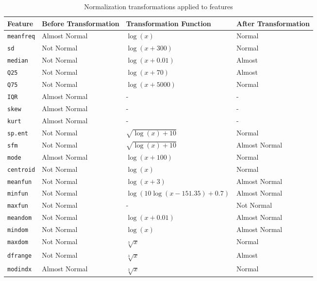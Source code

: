 \documentclass{article}
\begin{document}
	{
		\renewcommand{\arraystretch}{1.5}
		\begin{table}
			\centering
			\begin{tabularx}{\textwidth}{@{}lXlX@{}}
				\toprule
				\textbf{Feature} & \textbf{Before Transformation} & \textbf{Transformation Function} & \textbf{After Transformation} \\
				\midrule
				\texttt{meanfreq} & Almost Normal & $\log(x)$ & Normal \\
				\texttt{sd} & Not Normal & $\log(x + 300)$ & Normal \\
				\texttt{median} & Not Normal & $\log(x + 0.01)$ & Almost \\
				\texttt{Q25} & Not Normal & $\log(x  + 70)$ & Almost \\
				\texttt{Q75} & Not Normal & $\log(x + 5000)$ & Normal \\
				\texttt{IQR} & Almost Normal & - & - \\
				\texttt{skew} & Almost Normal & - & - \\
				\texttt{kurt} & Almost Normal & - & - \\
				\texttt{sp.ent} & Not Normal & $\sqrt{\log(x) + 10}$ & Normal \\
				\texttt{sfm} & Not Normal & $\sqrt{\log(x) + 10}$ & Almost Normal \\
				\texttt{mode} & Almost Normal & $\log(x + 100)$ & Normal \\
				\texttt{centroid} & Not Normal & $\log(x)$ & Normal \\
				\texttt{meanfun} & Not Normal & $\log(x + 3)$ & Almost Normal \\
				\texttt{minfun} & Not Normal & $\log(10 \log(x - 151.35) + 0.7)$ & Almost Normal \\
				\texttt{maxfun} & Not Normal & - & Not Normal \\
				\texttt{meandom} & Not Normal & $\log(x+ 0.01)$ & Almost Normal \\
				\texttt{mindom} & Not Normal & $\log(x)$ & Almost Normal \\
				\texttt{maxdom} & Not Normal & $\sqrt[3]{x}$ & Normal \\
				\texttt{dfrange} & Not Normal & $\sqrt[3]{x}$ & Almost \\
				\texttt{modindx} & Almost Normal & $\sqrt[3]{x}$ & Normal \\
				\bottomrule
			\end{tabularx}
			\caption{Normalization transformations applied to features}
			\label{tab:feature_transformations}
		\end{table}
	}
	
\end{document}
